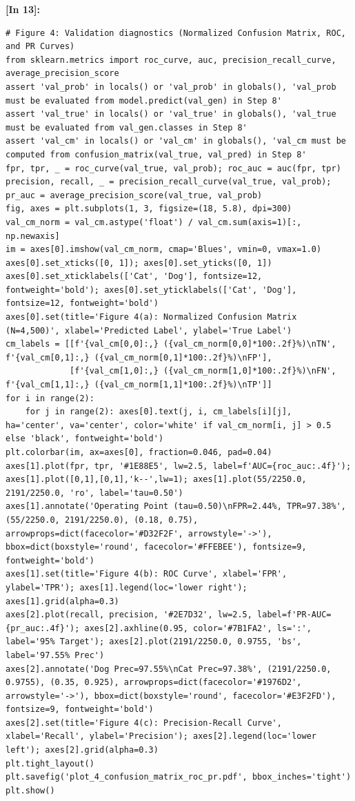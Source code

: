 \vspace{0.6em}
\noindent\textbf{\small [In 13]:}
\begin{lstlisting}[style=pycode]
# Figure 4: Validation diagnostics (Normalized Confusion Matrix, ROC, and PR Curves)
from sklearn.metrics import roc_curve, auc, precision_recall_curve, average_precision_score
assert 'val_prob' in locals() or 'val_prob' in globals(), 'val_prob must be evaluated from model.predict(val_gen) in Step 8'
assert 'val_true' in locals() or 'val_true' in globals(), 'val_true must be evaluated from val_gen.classes in Step 8'
assert 'val_cm' in locals() or 'val_cm' in globals(), 'val_cm must be computed from confusion_matrix(val_true, val_pred) in Step 8'
fpr, tpr, _ = roc_curve(val_true, val_prob); roc_auc = auc(fpr, tpr)
precision, recall, _ = precision_recall_curve(val_true, val_prob); pr_auc = average_precision_score(val_true, val_prob)
fig, axes = plt.subplots(1, 3, figsize=(18, 5.8), dpi=300)
val_cm_norm = val_cm.astype('float') / val_cm.sum(axis=1)[:, np.newaxis]
im = axes[0].imshow(val_cm_norm, cmap='Blues', vmin=0, vmax=1.0)
axes[0].set_xticks([0, 1]); axes[0].set_yticks([0, 1])
axes[0].set_xticklabels(['Cat', 'Dog'], fontsize=12, fontweight='bold'); axes[0].set_yticklabels(['Cat', 'Dog'], fontsize=12, fontweight='bold')
axes[0].set(title='Figure 4(a): Normalized Confusion Matrix (N=4,500)', xlabel='Predicted Label', ylabel='True Label')
cm_labels = [[f'{val_cm[0,0]:,} ({val_cm_norm[0,0]*100:.2f}%)\nTN', f'{val_cm[0,1]:,} ({val_cm_norm[0,1]*100:.2f}%)\nFP'],
             [f'{val_cm[1,0]:,} ({val_cm_norm[1,0]*100:.2f}%)\nFN', f'{val_cm[1,1]:,} ({val_cm_norm[1,1]*100:.2f}%)\nTP']]
for i in range(2):
    for j in range(2): axes[0].text(j, i, cm_labels[i][j], ha='center', va='center', color='white' if val_cm_norm[i, j] > 0.5 else 'black', fontweight='bold')
plt.colorbar(im, ax=axes[0], fraction=0.046, pad=0.04)
axes[1].plot(fpr, tpr, '#1E88E5', lw=2.5, label=f'AUC={roc_auc:.4f}'); axes[1].plot([0,1],[0,1],'k--',lw=1); axes[1].plot(55/2250.0, 2191/2250.0, 'ro', label='tau=0.50')
axes[1].annotate('Operating Point (tau=0.50)\nFPR=2.44%, TPR=97.38%', (55/2250.0, 2191/2250.0), (0.18, 0.75), arrowprops=dict(facecolor='#D32F2F', arrowstyle='->'), bbox=dict(boxstyle='round', facecolor='#FFEBEE'), fontsize=9, fontweight='bold')
axes[1].set(title='Figure 4(b): ROC Curve', xlabel='FPR', ylabel='TPR'); axes[1].legend(loc='lower right'); axes[1].grid(alpha=0.3)
axes[2].plot(recall, precision, '#2E7D32', lw=2.5, label=f'PR-AUC={pr_auc:.4f}'); axes[2].axhline(0.95, color='#7B1FA2', ls=':', label='95% Target'); axes[2].plot(2191/2250.0, 0.9755, 'bs', label='97.55% Prec')
axes[2].annotate('Dog Prec=97.55%\nCat Prec=97.38%', (2191/2250.0, 0.9755), (0.35, 0.925), arrowprops=dict(facecolor='#1976D2', arrowstyle='->'), bbox=dict(boxstyle='round', facecolor='#E3F2FD'), fontsize=9, fontweight='bold')
axes[2].set(title='Figure 4(c): Precision-Recall Curve', xlabel='Recall', ylabel='Precision'); axes[2].legend(loc='lower left'); axes[2].grid(alpha=0.3)
plt.tight_layout()
plt.savefig('plot_4_confusion_matrix_roc_pr.pdf', bbox_inches='tight')
plt.show()\end{lstlisting}
